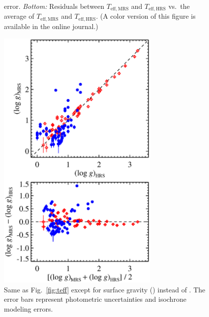\documentclass{emulateapj}
\begin{document}
\begin{figure}[p]
\begin{minipage}[t]{0.48\textwidth}
{{    error.  {\it Bottom:} Residuals between $T_{\mathrm{eff,MRS}}$ and
    $T_{\mathrm{eff,HRS}}$ vs.\ the average of $T_{\mathrm{eff,MRS}}$
    and $T_{\mathrm{eff,HRS}}$.  (A color version of this figure is
    available in the online journal.)}\label{fig:teff}}
\end{minipage}
\hfill
\begin{minipage}[t]{0.48\textwidth}
\centering
\includegraphics[width=0.7\textwidth]{logg_compare_orthogonal.eps}
\caption{Same as Fig.~\ref{fig:teff} except for surface gravity
  (\logg) instead of \teff.  The error bars represent photometric
  uncertainties and isochrone modeling errors.\label{fig:logg}}
\end{minipage}
\end{figure}
\end{document}
